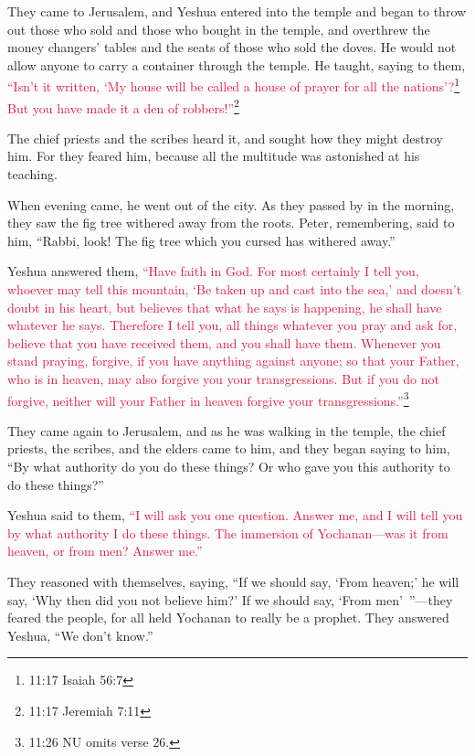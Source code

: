 \myverse{}They came to Jerusalem, and Yeshua entered into the temple and
began to throw out those who sold and those who bought in the temple, and overthrew the money changers’
tables and the seats of those who sold the doves.
\myverse{}He would not allow anyone to carry a container through the temple.
\myverse{}He taught, saying to them,
\textcolor{crimson}{“Isn’t it written, ‘My house will be called a house of prayer for all the nations’?}\footnote{11:17 Isaiah 56:7}
\textcolor{crimson}{But you have made it a den of robbers!”}\footnote{11:17 Jeremiah 7:11}

\myverse{}The chief priests and the scribes heard it, and sought how they
might destroy him. For they feared him, because all the multitude was astonished at his teaching.

\myverse{}When evening came, he went out of the city.
\myverse{}As they passed by in the morning, they saw the fig tree withered away from
the roots.
\myverse{}Peter, remembering, said to him, “Rabbi, look! The fig tree which you cursed
has withered away.”

\myverse{}Yeshua answered them,
\textcolor{crimson}{“Have faith in God.
}
\myverse{}\textcolor{crimson}{For most certainly I tell you, whoever may tell this mountain, ‘Be taken
	up and cast into the sea,’ and doesn’t doubt in his heart, but believes that what he says is happening,
	he shall have whatever he says.
}
\myverse{}\textcolor{crimson}{Therefore I tell you, all things whatever you pray and ask for, believe
	that you have received them, and you shall have them.
}
\myverse{}\textcolor{crimson}{Whenever you stand praying, forgive, if you have anything against anyone; so that your Father, who is in heaven, may also forgive you your transgressions.} \myverse{}\textcolor{crimson}{But if you do not forgive, neither will your Father in heaven forgive your transgressions.”}\footnote{11:26 NU omits verse 26.}

\myverse{}They came again to Jerusalem, and as he was walking in the temple,
the chief priests, the scribes, and the elders came to him,
\myverse{}and they began saying to him, “By what authority do you do these things?
Or who gave you this authority to do these things?”

\myverse{}Yeshua said to them,
\textcolor{crimson}{“I will ask you one question. Answer me, and I will tell you by what authority I do these things.
}
\myverse{}\textcolor{crimson}{The immersion of Yochanan—was it from heaven, or from men? Answer me.”
}

\myverse{}They reasoned with themselves, saying, “If we should say, ‘From
heaven;’ he will say, ‘Why then did you not believe him?’
\myverse{}If we should say, ‘From men’ ”—they feared the people, for all held Yochanan
to really be a prophet.
\myverse{}They answered Yeshua, “We don’t know.”

